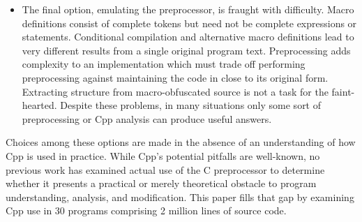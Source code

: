 \documentclass[10pt]{article}
\def\numpackages{30}
\def\numlines{2 million}
\begin{document}
\begin{itemize}
\item The final option, emulating the preprocessor, is fraught with
  difficulty.  Macro definitions consist of complete tokens but need not be
  complete expressions or statements.  Conditional compilation and
  alternative macro definitions lead to very different results from a
  single original program text.  Preprocessing adds complexity to an
  implementation which must trade off performing preprocessing against
  maintaining the code in close to its original form.  Extracting structure
  from macro-obfuscated source is not a task for the faint-hearted.
  Despite these problems, in many situations only some sort of
  preprocessing or Cpp analysis can produce useful answers.

\end{itemize}


Choices among these options are made in the absence of
an understanding of how Cpp is used in practice.
While  Cpp's potential pitfalls are well-known, no
previous work has examined actual use of the C preprocessor to
determine whether it presents a practical or merely theoretical
obstacle to program understanding, analysis, and modification.  This
paper fills that gap by examining Cpp use in {\numpackages} programs
comprising {\numlines} lines of source code.
\end{document}
